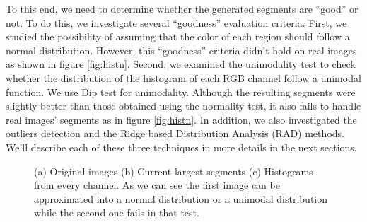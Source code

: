 \documentclass[10pt,twocolumn,letterpaper]{article}
\begin{document}
To this end, we need to determine whether the generated segments are ``good'' or not.
To do this, we investigate several ``goodness'' evaluation criteria.
First, we studied the possibility of assuming that the color of each region should follow a normal distribution.
However, this ``goodness'' criteria didn't hold on real images as shown in figure \ref{fig:histn}.
Second, we examined the unimodality test to check whether the distribution of the histogram of each RGB channel follow a unimodal function.
We use Dip test \cite{dip-unimodality} for unimodality. Although the resulting segments were slightly better than those obtained using the normality test,
it also fails to handle real images' segments as in figure \ref{fig:histn}.
In addition, we also investigated the outliers detection and the Ridge based Distribution Analysis (RAD) methods.
We'll describe each of these three techniques in more details in the next sections.

\begin{figure}[!t]
\centering
{}
\caption{(a) Original images (b) Current largest segments (c) Histograms from
every channel. As we can see the first image can be approximated into a
normal distribution or a unimodal distribution while the second one fails in
that test.}
\label{fig:colorhists}
\end{figure}
\end{document}
